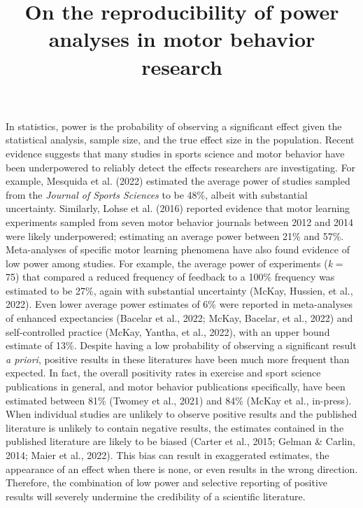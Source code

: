 \documentclass[
  man, donotrepeattitle,mask,floatsintext]{apa7}
\title{On the reproducibility of power analyses in motor behavior research}
\author{\phantom{0}}
\date{}
\affiliation{\phantom{0}}
\begin{document}
\maketitle

In statistics, power is the probability of observing a significant effect given the statistical analysis, sample size, and the true effect size in the population. Recent evidence suggests that many studies in sports science and motor behavior have been underpowered to reliably detect the effects researchers are investigating. For example, Mesquida et al. (2022) estimated the average power of studies sampled from the \emph{Journal of Sports Sciences} to be 48\%, albeit with substantial uncertainty. Similarly, Lohse et al. (2016) reported evidence that motor learning experiments sampled from seven motor behavior journals between 2012 and 2014 were likely underpowered; estimating an average power between 21\% and 57\%. Meta-analyses of specific motor learning phenomena have also found evidence of low power among studies. For example, the average power of experiments (\emph{k} = 75) that compared a reduced frequency of feedback to a 100\% frequency was estimated to be 27\%, again with substantial uncertainty (McKay, Hussien, et al., 2022). Even lower average power estimates of 6\% were reported in meta-analyses of enhanced expectancies (Bacelar et al., 2022; McKay, Bacelar, et al., 2022) and self-controlled practice (McKay, Yantha, et al., 2022), with an upper bound estimate of 13\%. Despite having a low probability of observing a significant result \emph{a priori}, positive results in these literatures have been much more frequent than expected. In fact, the overall positivity rates in exercise and sport science publications in general, and motor behavior publications specifically, have been estimated between 81\% (Twomey et al., 2021) and 84\% (McKay et al., in-press). When individual studies are unlikely to observe positive results and the published literature is unlikely to contain negative results, the estimates contained in the published literature are likely to be biased (Carter et al., 2015; Gelman \& Carlin, 2014; Maier et al., 2022). This bias can result in exaggerated estimates, the appearance of an effect when there is none, or even results in the wrong direction. Therefore, the combination of low power and selective reporting of positive results will severely undermine the credibility of a scientific literature.
\end{document}
